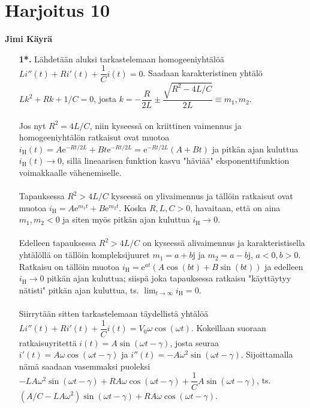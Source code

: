 \documentclass[12pt,fleqn]{article}
\begin{document}
\section*{Harjoitus 10}
\textbf{Jimi Käyrä}
\begin{enumerate}[label=\textbf{\arabic*.}]
\item [\textbf{1*.}] Lähdetään aluksi tarkastelemaan homogeeniyhtälöä \(Li''(t)+Ri'(t)+\dfrac{1}{C}i(t)=0\). Saadaan karakteristinen yhtälö \(Lk^2+Rk+1/C=0\), josta \(k=-\dfrac{R}{2L}\pm \dfrac{\sqrt{R^2-4L/C}}{2L}\equiv m_1, m_2\).\\
 \\
Jos nyt \(R^2=4L/C\), niin kyseessä on kriittinen vaimennus ja homogeeniyhtälön ratkaisut ovat muotoa \(i_\text{H}(t)=A\text{e}^{-Rt/2L}+Bt\text{e}^{-Rt/2L}=\text{e}^{-Rt/2L}(A+Bt)\) ja pitkän ajan kuluttua \(i_\text{H}(t)\to 0\), sillä lineaarisen funktion kasvu "häviää" eksponenttifunktion voimakkaalle vähenemiselle.\\
 \\
Tapauksessa \(R^2>4L/C\) kyseessä on ylivaimennus ja tällöin ratkaisut ovat muotoa \(i_\text{H}=A\text{e}^{m_1 t}+B\text{e}^{m_2 t}\). Koska \(R, L, C >0\), havaitaan, että on aina \(m_1, m_2 < 0\) ja siten myös pitkän ajan kuluttua \(i_\text{H}\to 0\).\\
 \\
Edelleen tapauksessa \(R^2>4L/C\) on kyseessä alivaimennus ja karakteristisella yhtälöllä on tällöin kompleksijuuret \(m_1=a+b\text{j}\) ja \(m_2=a-b\text{j}\), \(a<0, b>0\). Ratkaisu on tällöin muotoa \(i_\text{H}=\text{e}^{at}(A\cos (bt)+B\sin (bt))\) ja edelleen \(i_\text{H}\to 0\) pitkän ajan kuluttua; siispä joka tapauksessa ratkaisu "käyttäytyy nätisti" pitkän ajan kuluttua, ts. \(\displaystyle \lim_{t\to \infty} i_\text{H}=0\).\\
 \\
Siirrytään sitten tarkastelemaan täydellistä yhtälöä \(Li''(t)+Ri'(t)+\dfrac{1}{C} i(t)=V_0 \omega \cos (\omega t)\). Kokeillaan suoraan ratkaisuyritettä \(i(t)=A\sin (\omega t-\gamma)\), josta seuraa \(i'(t)=A\omega \cos(\omega t-\gamma)\) ja \(i''(t)=-A\omega ^2 \sin(\omega t-\gamma)\). Sijoittamalla nämä saadaan vasemmaksi puoleksi\\ \(-LA \omega ^2\sin (\omega t - \gamma)+RA \omega \cos (\omega t-\gamma)+\dfrac{1}{C}A\sin (\omega t-\gamma)\), ts. \\ \((A/C-LA\omega ^2) \sin (\omega t-\gamma)+RA\omega \cos(\omega t-\gamma)\).\\
 \\

\end{enumerate}
\end{document}
